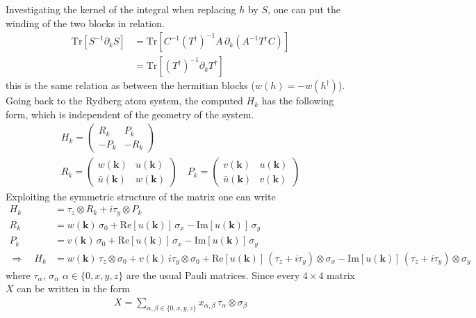 Investigating the kernel of the integral when replacing $h$ by $S$, one can put the winding of the two blocks in relation.
\begin{align*}
    \text{Tr}\left[ S^{-1}\partial_k S  \right]&= \text{Tr}\left[ C^{-1}(T^\dagger)^{-1}A\,\partial_k \left( A^{-1}T^\dagger C \right)  \right]\\
    &=  \text{Tr}\left[ (T^\dagger)^{-1}\partial_k T^\dagger  \right]
\end{align*}
this is the same relation as between the hermitian blocks ($w(h)=-w(h^\dagger)$). Going back to the Rydberg atom system, the computed $H_k$ has the following form, which is independent of the geometry of the system.
\begin{gather*}
    H_k = \begin{pmatrix}
        R_k & P_k\\
        -P_k & -R_k
       \end{pmatrix}\\
    R_k = \begin{pmatrix}
        w(\mathbf{k}) & u(\mathbf{k})\\
        \bar{u}(\mathbf{k})& w(\mathbf{k})
    \end{pmatrix}\quad P_k = \begin{pmatrix}
        v(\mathbf{k}) & u(\mathbf{k})\\
        \bar{u}(\mathbf{k}) & v(\mathbf{k})
    \end{pmatrix}
\end{gather*}
Exploiting the symmetric structure of the matrix one can write
\begin{align*}
    H_k &= \tau_z \otimes R_k + i\tau_y \otimes P_k\\
    R_k &=  w(\mathbf{k})\,\sigma_0  + \text{Re}[u(\mathbf{k})]\,\sigma_x -\text{Im}[u(\mathbf{k})]\,\sigma_y\\
    P_k &=  v(\mathbf{k})\,\sigma_0  + \text{Re}[u(\mathbf{k})]\,\sigma_x -\text{Im}[u(\mathbf{k})]\,\sigma_y\\
    \Rightarrow\quad H_k &= w(\mathbf{k})\,\tau_z \otimes \sigma_0 + v(\mathbf{k})\,i\tau_y \otimes \sigma_0 + \text{Re}[u(\mathbf{k})]\,(\tau_z+i\tau_y) \otimes \sigma_x - \text{Im}[u(\mathbf{k})]\,(\tau_z+i\tau_y) \otimes \sigma_y
\end{align*}
where $\tau_\alpha$, $\sigma_\alpha$ $\alpha\in\{0,x,y,z\}$ are the usual Pauli matrices. Since every $4\times4$ matrix $X$ can be written in the form
\begin{align*}
    X = \sum_{\alpha,\beta\in\{0,x,y,z\}}x_{\alpha,\beta}\, \tau_\alpha \otimes \sigma_\beta
\end{align*}
